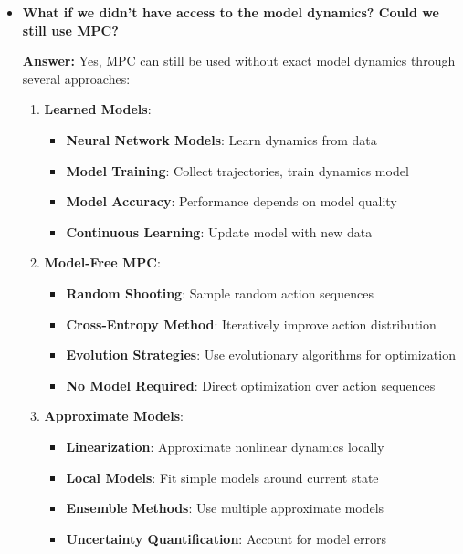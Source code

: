\begin{itemize}
    \item \textbf{What if we didn't have access to the model dynamics? Could we still use MPC?}
    
    \textbf{Answer:} Yes, MPC can still be used without exact model dynamics through several approaches:
    
    \begin{enumerate}
        \item \textbf{Learned Models}:
        \begin{itemize}
            \item \textbf{Neural Network Models}: Learn dynamics from data
            \item \textbf{Model Training}: Collect trajectories, train dynamics model
            \item \textbf{Model Accuracy}: Performance depends on model quality
            \item \textbf{Continuous Learning}: Update model with new data
        \end{itemize}
        
        \item \textbf{Model-Free MPC}:
        \begin{itemize}
            \item \textbf{Random Shooting}: Sample random action sequences
            \item \textbf{Cross-Entropy Method}: Iteratively improve action distribution
            \item \textbf{Evolution Strategies}: Use evolutionary algorithms for optimization
            \item \textbf{No Model Required}: Direct optimization over action sequences
        \end{itemize}
        
        \item \textbf{Approximate Models}:
        \begin{itemize}
            \item \textbf{Linearization}: Approximate nonlinear dynamics locally
            \item \textbf{Local Models}: Fit simple models around current state
            \item \textbf{Ensemble Methods}: Use multiple approximate models
            \item \textbf{Uncertainty Quantification}: Account for model errors
        \end{itemize}
        

\end{enumerate}
\end{itemize}
